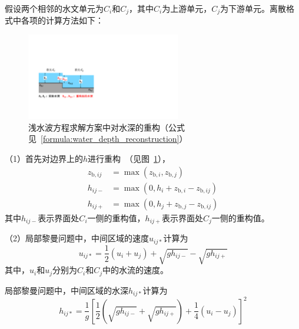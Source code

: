 假设两个相邻的水文单元为$C_i$和$C_j$，其中$C_i$为上游单元，$C_j$为下游单元。离散格式中各项的计算方法如下：

{
  \begin{figure}[htbp]
    \centering
    \includegraphics[width=0.6\textwidth]{Figures/侧向流/水深重构.pdf}
    \caption{浅水波方程求解方案中对水深的重构（公式见~\ref{formula:water_depth_reconstruction}）}
    \label{fig:水深重构}
  \end{figure}
}

（1）首先对边界上的$h$进行重构~\citep{audusse2004scientificcomputing}（见图~\ref{fig:水深重构}），
\begin{equation} \label{formula:water_depth_reconstruction}
  \begin{aligned}
    z_{\mathrm{b},ij} & = \max\left(z_{\mathrm{b},i}, z_{\mathrm{b},j}\right) \\
    h_{ij-} & =  \max\left(0, h_i + z_{\mathrm{b},i} - z_{\mathrm{b},ij} \right) \\
    h_{ij+} & =  \max\left(0, h_j + z_{\mathrm{b},j} - z_{\mathrm{b},ij} \right)
  \end{aligned}
\end{equation}
其中$h_{ij-}$表示界面处$C_i$一侧的重构值，$h_{ij+}$表示界面处$C_j$一侧的重构值。

（2）局部黎曼问题中，中间区域的速度$u_{ij*}$计算为
\begin{equation}
  u_{ij*} = \frac{1}{2}\left(u_i + u_j\right) + \sqrt{g h_{ij-}} - \sqrt{g h_{ij+}}
\end{equation}
其中，$u_i$和$u_j$分别为$C_i$和$C_j$中的水流的速度。

局部黎曼问题中，中间区域的水深$h_{ij*}$计算为
\begin{equation}
  h_{ij*} = \frac{1}{g}\left[\frac{1}{2}\left(\sqrt{g h_{ij-}} + \sqrt{g h_{ij+}}\right) + \frac{1}{4}\left(u_i - u_j\right)\right]^2
\end{equation}

